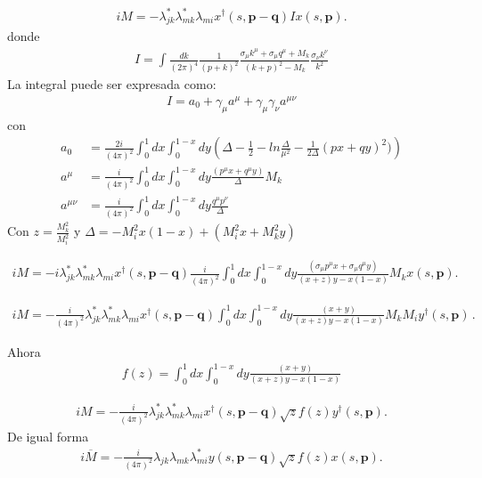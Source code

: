 \begin{align}
iM=-\lambda^*_{jk}\lambda^*_{mk}\lambda_{mi}x^\dagger(s,\boldsymbol{p-q})I
x(s,\boldsymbol{p}).
\end{align} 
donde
\begin{align}
I=\int \frac{dk}{(2\pi)^4}\frac{1}{(p+k)^2}\frac{\sigma_{\mu}k^{\mu}+\sigma_{\mu}q^{\mu}+M_{k}}{(k+p)^2-M_k}\frac{\sigma_{\nu}k^{\nu}}{k^2}
\end{align}
La integral puede ser expresada como:
\begin{align}
\label{integral}
I=a_{0}+\gamma_{\mu}a^{\mu}+\gamma_{\mu}\gamma_{\nu}a^{\mu\nu}
\end{align}
con
\begin{align}
a_{0}&=\frac{2i}{(4\pi)^2}\int_{0}^{1} dx \int_{0}^{1-x} dy \left(\Delta-\frac{1}{2}-ln\frac{\Delta}{\mu^2}-\frac{1}{2\Delta}(px+qy)^2)\right)\nonumber\\
a^{\mu}&=\frac{i}{(4\pi)^2}\int_{0}^{1} dx \int_{0}^{1-x} dy \frac{(p^{\mu}x+q^{\mu}y)}{\Delta}M_{k}\nonumber\\
a^{\mu\nu}&=\frac{i}{(4\pi)^2}\int_{0}^{1} dx \int_{0}^{1-x} dy \frac{q^{\mu}p^{\nu}}{\Delta}
\end{align}
Con $z=\frac{M^2_{k}}{M^2_{i}}$ y $\Delta=-M_{i}^2x(1-x)+(M_{i}^2x+M_{k}^2y)$

\begin{align}
iM=-i\lambda^*_{jk}\lambda^*_{mk}\lambda_{mi}x^\dagger(s,\boldsymbol{p-q})\frac{i}{(4\pi)^2}\int_{0}^{1} dx \int_{0}^{1-x} dy \frac{(\sigma_{\mu}p^{\mu}x+\sigma_{\mu}q^{\mu}y)
}{(x+z)y-x(1-x)}M_{k}
x(s,\boldsymbol{p}).
\end{align} 

\begin{align}
iM=-\frac{i}{(4\pi)^2}\lambda^*_{jk}\lambda^*_{mk}\lambda_{mi}x^\dagger(s,\boldsymbol{p-q})\int_{0}^{1} dx \int_{0}^{1-x} dy\frac{(x+y)}{(x+z)y-x(1-x)} M_{k}M_{i}
y^\dagger(s,\boldsymbol{p})\, .
\end{align} 

Ahora 
\begin{align}
\label{int}
f(z)=\int_{0}^{1} dx \int_{0}^{1-x} dy\frac{(x+y)}{(x+z)y-x(1-x)}
\end{align}
 
 \begin{align}
 iM=-\frac{i}{(4\pi)^2}\lambda^*_{jk}\lambda^*_{mk}\lambda_{mi}x^\dagger(s,\boldsymbol{p-q})\sqrt{z}f(z)y^\dagger(s,\boldsymbol{p}).
 \end{align}
De igual forma 
  \begin{align}
 i\overline{M}=-\frac{i}{(4\pi)^2}\lambda_{jk}\lambda_{mk}\lambda^*_{mi}y(s,\boldsymbol{p-q})\sqrt{z}f(z)x(s,\boldsymbol{p}).
 \end{align}
 
